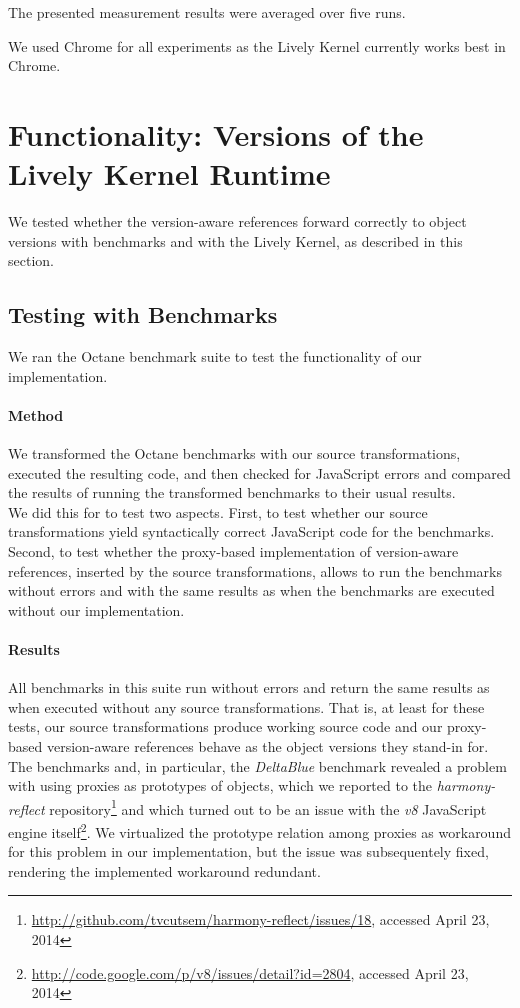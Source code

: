 The presented measurement results were averaged over five runs.

We used Chrome for all experiments as the Lively Kernel currently works best in Chrome.



\section{Functionality: Versions of the Lively Kernel Runtime} \label{sec:EVALUATION:2}

We tested whether the version-aware references forward correctly to object versions with benchmarks and with the Lively Kernel, as described in this section.

\subsection{Testing with Benchmarks}

We ran the Octane benchmark suite to test the functionality of our implementation.

\paragraph{Method}
We transformed the Octane benchmarks with our source transformations, executed the resulting code, and then checked for JavaScript errors and compared the results of running the transformed benchmarks to their usual results.\\
We did this for to test two aspects.
First, to test whether our source transformations yield syntactically correct JavaScript code for the benchmarks.
Second, to test whether the proxy-based implementation of version-aware references, inserted by the source transformations, allows to run the benchmarks without errors and with the same results as when the benchmarks are executed without our implementation.


\paragraph{Results}
All benchmarks in this suite run without errors and return the same results as when executed without any source transformations.
That is, at least for these tests, our source transformations produce working source code and our proxy-based version-aware references behave as the object versions they stand-in for.
The benchmarks and, in particular, the \emph{DeltaBlue} benchmark revealed a problem with using proxies as prototypes of objects, which we reported to the \emph{harmony-reflect} repository\footnote{\url{http://github.com/tvcutsem/harmony-reflect/issues/18}, accessed April 23, 2014} and which turned out to be an issue with the \emph{v8} JavaScript engine itself\footnote{\url{http://code.google.com/p/v8/issues/detail?id=2804}, accessed April 23, 2014}.
We virtualized the prototype relation among proxies as workaround for this problem in our implementation, but the issue was subsequentely fixed, rendering the implemented workaround redundant.

